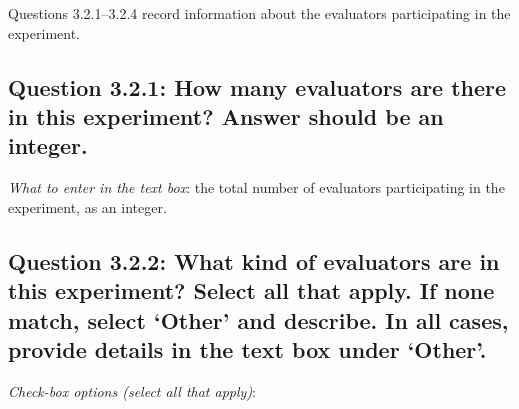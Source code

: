 \documentclass[11pt,a4paper]{article}
\begin{document}
Questions 3.2.1--3.2.4 record information about the evaluators participating in the experiment.

\vspace{-.3cm}
\subsection*{Question 3.2.1:  How many evaluators are there in this experiment? Answer should be an integer.}

\noindent\textit{What to enter in the text box}: the total number of evaluators participating in the experiment, as an integer.

\vspace{-.3cm}
\subsection*{Question 3.2.2:  What kind of evaluators are in this experiment? Select all that apply. If none match, select `Other' and describe. In all cases, provide details in the text box under `Other'.}

\noindent\textit{Check-box options (select all that apply)}:  
\vspace{-.1cm}
\end{document}
